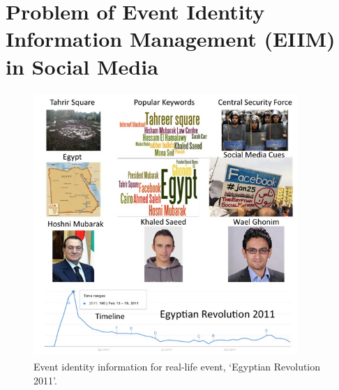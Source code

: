 \section{Problem of Event Identity Information Management (EIIM) in Social Media\label{problem}}

\begin{figure}[htbp]
  \caption{Event identity information for real-life event, `Egyptian Revolution 2011'.}
\label{eventidentity}
  \centering
    \includegraphics[width=10cm,height=10cm]{Figures/eventIdentity.jpg}
\end{figure}


